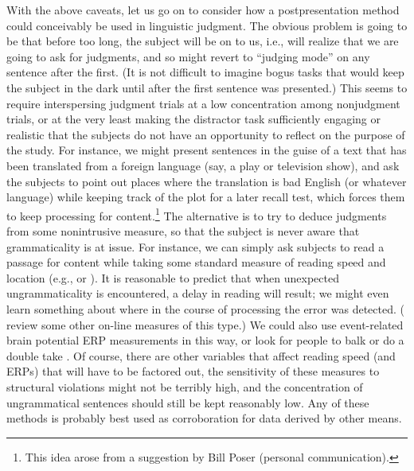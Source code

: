 With the above caveats, let us go on to consider how a postpresentation meth\-od could conceivably be used in linguistic judgment. The obvious problem is going to be that before too long, the subject will be on to us, i.e., will realize that we are going to ask for judgments, and so might revert to ``judging mode'' on any
sentence after the first. (It is not difficult to imagine bogus tasks that would keep the subject in the dark until after the first sentence was presented.) This seems to require interspersing judgment trials at a low concentration among nonjudgment trials, or at the very least making the distractor task sufficiently engaging or realistic that the subjects do not have an opportunity to reflect on the purpose of the study. For instance, we might present sentences in the guise of a text that has been translated from a foreign language (say, a play or television show), and ask the subjects to point out places where the translation is bad English (or whatever language) while keeping track of the plot for a later recall test, which forces them to keep processing for content.\footnote{This idea arose from a suggestion by Bill Poser (personal communication).}
 The alternative is to try to deduce judgments from some nonintrusive measure, so that the subject is never aware that grammaticality is at issue. For instance, we can simply ask subjects to read a passage for content while taking some standard measure of reading speed and location (e.g.,  or ). It is reasonable to predict that when unexpected ungrammaticality is encountered, a delay in reading will result; we might even learn something about where in the course of processing the error was detected. (\citet{KutasEtAl1983} review some other on-line measures of this type.) We could also use event-related brain potential ERP measurements in this way, or look for people to balk or do a double take \citep{Newmeyer1983}. Of course, there are other variables that affect reading speed (and ERPs) that will have to be factored out, the sensitivity of these measures to structural violations might not be terribly high, and the concentration of ungrammatical sentences should still be kept reasonably low. Any of these methods is probably best used as corroboration for data derived by other means.

